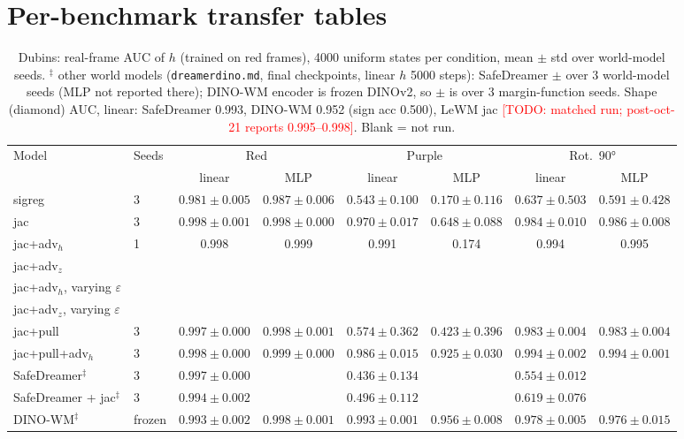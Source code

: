 \documentclass{article}
\newcommand{\todo}[1]{\textcolor{red}{[TODO: #1]}}
\begin{document}
\section{Per-benchmark transfer tables}
\label{app:transfer}
\begin{table}[t]\centering\small
\caption{Dubins: real-frame AUC of $h$ (trained on red frames), 4000 uniform states per condition, mean $\pm$ std over world-model seeds. $^\ddagger$ other world models (\texttt{dreamerdino.md}, final checkpoints, linear $h$ 5000 steps): SafeDreamer $\pm$ over 3 world-model seeds (MLP not reported there); DINO-WM encoder is frozen DINOv2, so $\pm$ is over 3 margin-function seeds. Shape (diamond) AUC, linear: SafeDreamer 0.993, DINO-WM 0.952 (sign acc 0.500), LeWM jac \todo{matched run; post-oct-21 reports 0.995--0.998}. Blank = not run.}
\label{tab:dubins_auc}
\setlength{\tabcolsep}{3pt}
\begin{tabular}{llcccccc}
\toprule
Model & Seeds & \multicolumn{2}{c}{Red} & \multicolumn{2}{c}{Purple} & \multicolumn{2}{c}{Rot.\ 90°} \\
\cmidrule(lr){3-4}\cmidrule(lr){5-6}\cmidrule(lr){7-8}
 & & linear & MLP & linear & MLP & linear & MLP \\
\midrule
sigreg & 3 & $0.981 \pm 0.005$ & $0.987 \pm 0.006$ & $0.543 \pm 0.100$ & $0.170 \pm 0.116$ & $0.637 \pm 0.503$ & $0.591 \pm 0.428$ \\
jac & 3 & $0.998 \pm 0.001$ & $0.998 \pm 0.000$ & $0.970 \pm 0.017$ & $0.648 \pm 0.088$ & $0.984 \pm 0.010$ & $0.986 \pm 0.008$ \\
jac+adv$_h$ & 1 & 0.998 & 0.999 & 0.991 & 0.174 & 0.994 & 0.995 \\
jac+adv$_z$ & &  &  &  &  &  &  \\
jac+adv$_h$, varying $\varepsilon$ & &  &  &  &  &  &  \\
jac+adv$_z$, varying $\varepsilon$ & &  &  &  &  &  &  \\
\midrule
jac+pull & 3 & $0.997 \pm 0.000$ & $0.998 \pm 0.001$ & $0.574 \pm 0.362$ & $0.423 \pm 0.396$ & $0.983 \pm 0.004$ & $0.983 \pm 0.004$ \\
jac+pull+adv$_h$ & 3 & $0.998 \pm 0.000$ & $0.999 \pm 0.000$ & $0.986 \pm 0.015$ & $0.925 \pm 0.030$ & $0.994 \pm 0.002$ & $0.994 \pm 0.001$ \\
\midrule
SafeDreamer$^\ddagger$ & 3 & $0.997 \pm 0.000$ &  & $0.436 \pm 0.134$ &  & $0.554 \pm 0.012$ &  \\
SafeDreamer + jac$^\ddagger$ & 3 & $0.994 \pm 0.002$ &  & $0.496 \pm 0.112$ &  & $0.619 \pm 0.076$ &  \\
DINO-WM$^\ddagger$ & frozen & $0.993 \pm 0.002$ & $0.998 \pm 0.001$ & $0.993 \pm 0.001$ & $0.956 \pm 0.008$ & $0.978 \pm 0.005$ & $0.976 \pm 0.015$ \\
\bottomrule
\end{tabular}
\end{table}
\end{document}
